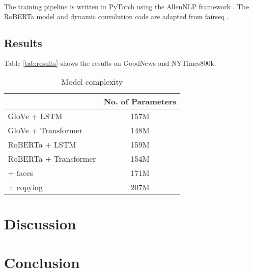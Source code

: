\documentclass[10pt,twocolumn,letterpaper]{article}
\begin{document}
The training pipeline is written in PyTorch \cite{Paszke2017Automatic} using
the AllenNLP framework \cite{Gardner2017AllenNLP}. The RoBERTa model and
dynamic convolution code are adapted from fairseq \cite{Ott2019Fairseq}.

\subsection{Results}

Table \ref{tab:results} shows the results on GoodNews and NYTimes800k.


\begin{table}[t]
	\caption {Model complexity}
	\label{tab:models}
	\centering
	\begin{tabularx}{\linewidth}{Xc}
		\toprule
        & No. of Parameters \\
      \midrule
      GloVe + LSTM & 157M \\
      GloVe + Transformer & 148M \\
      RoBERTa + LSTM & 159M \\
      RoBERTa + Transformer & 154M \\
      \quad + faces & 171M \\
      \quad\quad + copying & 207M \\
		\bottomrule
	\end{tabularx}
\end{table}

\section{Discussion}




\section{Conclusion}

{\small


}
\end{document}
